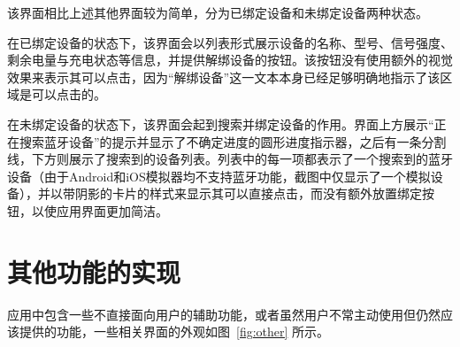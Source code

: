该界面相比上述其他界面较为简单，分为已绑定设备和未绑定设备两种状态。

在已绑定设备的状态下，该界面会以列表形式展示设备的名称、型号、信号强度、剩余电量与充电状态等信息，并提供解绑设备的按钮。该按钮没有使用额外的视觉效果来表示其可以点击，因为“解绑设备”这一文本本身已经足够明确地指示了该区域是可以点击的。

在未绑定设备的状态下，该界面会起到搜索并绑定设备的作用。界面上方展示“正在搜索蓝牙设备”的提示并显示了不确定进度的圆形进度指示器，之后有一条分割线，下方则展示了搜索到的设备列表。列表中的每一项都表示了一个搜索到的蓝牙设备（由于Android和iOS模拟器均不支持蓝牙功能，截图中仅显示了一个模拟设备），并以带阴影的卡片的样式来显示其可以直接点击，而没有额外放置绑定按钮，以使应用界面更加简洁。



\section{其他功能的实现}\label{sec:other}

应用中包含一些不直接面向用户的辅助功能，或者虽然用户不常主动使用但仍然应该提供的功能，一些相关界面的外观如图~\ref{fig:other} 所示。

